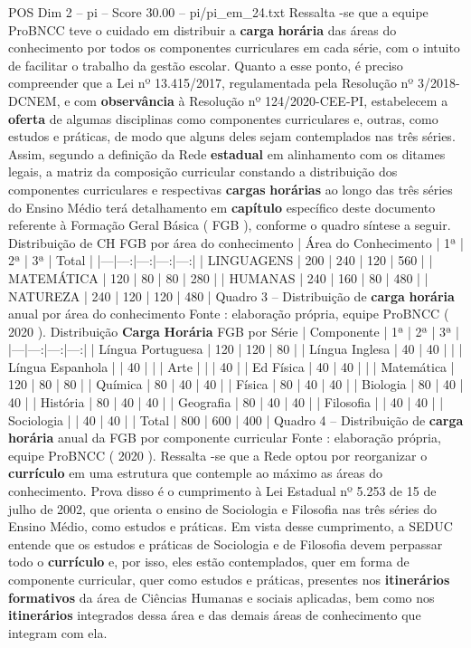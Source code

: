 \begin{textsample}{POS Dim 2 – pi – Score 30.00 – pi/pi\_em\_24.txt}
Ressalta -se que a equipe ProBNCC teve o cuidado em distribuir a \textbf{carga} \textbf{horária} das áreas do conhecimento por todos os componentes curriculares em cada série, com o intuito de facilitar o trabalho da gestão escolar.
Quanto a esse ponto, é preciso compreender que a Lei nº 13.415/2017, regulamentada pela Resolução nº 3/2018-DCNEM, e com \textbf{observância} à Resolução nº 124/2020-CEE-PI, estabelecem a \textbf{oferta} de algumas disciplinas como componentes curriculares e, outras, como estudos e práticas, de modo que alguns deles sejam contemplados nas três séries.
Assim, segundo a definição da Rede \textbf{estadual} em alinhamento com os ditames legais, a matriz da composição curricular constando a distribuição dos componentes curriculares e respectivas \textbf{cargas} \textbf{horárias} ao longo das três séries do Ensino Médio terá detalhamento em \textbf{capítulo} específico deste documento referente à Formação Geral Básica ( FGB ), conforme o quadro síntese a seguir.
Distribuição de CH FGB por área do conhecimento | Área do Conhecimento | 1ª | 2ª | 3ª | Total | |---|---:|---:|---:|---:| | LINGUAGENS | 200 | 240 | 120 | 560 | | MATEMÁTICA | 120 | 80 | 80 | 280 | | HUMANAS | 240 | 160 | 80 | 480 | | NATUREZA | 240 | 120 | 120 | 480 | Quadro 3 – Distribuição de \textbf{carga} \textbf{horária} anual por área do conhecimento Fonte : elaboração própria, equipe ProBNCC ( 2020 ).
Distribuição \textbf{Carga} \textbf{Horária} FGB por Série | Componente | 1ª | 2ª | 3ª | |---|---:|---:|---:| | Língua Portuguesa | 120 | 120 | 80 | | Língua Inglesa | 40 | 40 | | | Língua Espanhola | | 40 | | | Arte | | | 40 | | Ed Física | 40 | 40 | | | Matemática | 120 | 80 | 80 | | Química | 80 | 40 | 40 | | Física | 80 | 40 | 40 | | Biologia | 80 | 40 | 40 | | História | 80 | 40 | 40 | | Geografia | 80 | 40 | 40 | | Filosofia | | 40 | 40 | | Sociologia | | 40 | 40 | | Total | 800 | 600 | 400 | Quadro 4 – Distribuição de \textbf{carga} \textbf{horária} anual da FGB por componente curricular Fonte : elaboração própria, equipe ProBNCC ( 2020 ).
Ressalta -se que a Rede optou por reorganizar o \textbf{currículo} em uma estrutura que contemple ao máximo as áreas do conhecimento.
Prova disso é o cumprimento à Lei Estadual nº 5.253 de 15 de julho de 2002, que orienta o ensino de Sociologia e Filosofia nas três séries do Ensino Médio, como estudos e práticas.
Em vista desse cumprimento, a SEDUC entende que os estudos e práticas de Sociologia e de Filosofia devem perpassar todo o \textbf{currículo} e, por isso, eles estão contemplados, quer em forma de componente curricular, quer como estudos e práticas, presentes nos \textbf{itinerários} \textbf{formativos} da área de Ciências Humanas e sociais aplicadas, bem como nos \textbf{itinerários} integrados dessa área e das demais áreas de conhecimento que integram com ela.

\end{textsample}
